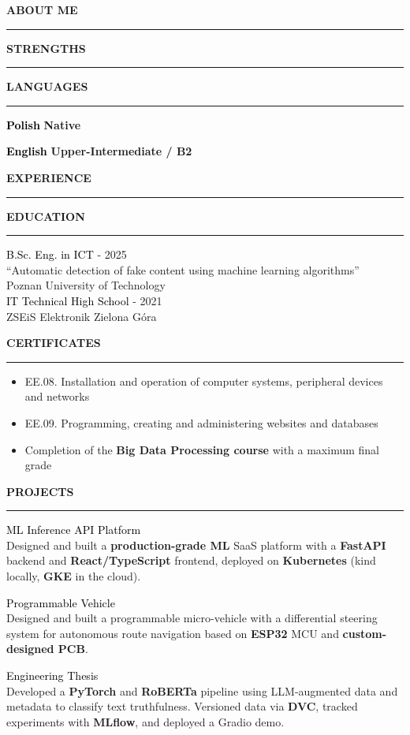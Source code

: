 \documentclass[a4paper,11pt]{article}
\newcommand{\CVSectionHeader}{%
    \headingfont\bfseries\fontsize{20pt}{22pt}\selectfont
    \color{secheadercolor}%
}
\newcommand{\CVSection}[2]{%
    \par
    {\CVSectionHeader \uppercase{#1}}\\
    \textcolor{hrcolor}{\rule{\textwidth}{0.1cm}}\vspace{0.2cm}
    #2
}
\newcommand{\ProjectsEntry}[3]{%
    {\fontsize{12pt}{10pt}\selectfont\textcolor{black}{#1} \href{#2}{\textcolor{accentcolor}{\faGithub}}}\\
    {\fontsize{8pt}{10pt}\selectfont#3}
}
\newcommand{\CVEduEntry}[3]{
    {\fontsize{12pt}{10pt}\selectfont \textcolor{black}{#1}}
    \hfill
    {\fontsize{9pt}{5pt}\selectfont #3} \\
    \textcolor{accentcolor}{#2} \\
}
\newcommand{\CVEduEntryExtra}[4]{
    {\fontsize{12pt}{10pt}\selectfont \textcolor{black}{#1}}
    \hfill
    {\fontsize{9pt}{5pt}\selectfont #3} \\
    {\fontsize{9pt}{5pt}\selectfont#4} \\
    \textcolor{accentcolor}{#2} \\
}
\newcommand{\CVCertificate}[1]{
    \item \fontsize{10pt}{5pt}\selectfont #1
}
\newcommand{\CVLanguage}[2]{
    {\fontsize{10pt}{5pt}\selectfont \textcolor{black}{\textbf{#1}} \hfill \textbf{#2}\\}
}
\newcommand{\dashedline}{
    \hdashrule{\textwidth}{0.5pt}{0.1cm}
}
\begin{document}
\begin{minipage}[t]{0.38\textwidth}
    \CVSection{About Me}{{\fontsize{10pt}{12pt}\selectfont
    }}
    \vspace{0.5cm}
    \CVSection{Strengths}{
    }
    \vspace{0.5cm}
    \CVSection{Languages}{
        \CVLanguage{Polish}{Native}
        \dashedline
        \CVLanguage{English}{Upper-Intermediate / B2}
    }
\end{minipage}
\hfill
\begin{minipage}[t]{0.58\textwidth}
    \CVSection{Experience}{
    }
    \vspace{0.5cm}
    \CVSection{Education}{
        \CVEduEntryExtra{B.Sc. Eng. in ICT}{Poznan University of Technology}{2021 - 2025}{``Automatic detection of fake content using machine learning algorithms''}
        
        \CVEduEntry{IT Technical High School}{ZSEiS Elektronik Zielona Góra}{2017 - 2021}
    }
    \CVSection{Certificates}{
        \begin{itemize}[leftmargin=*, topsep=0pt]\itemsep0em
            \CVCertificate{EE.08. Installation and operation of computer systems, peripheral devices and networks}
            \CVCertificate{EE.09. Programming, creating and administering websites and databases}
            \CVCertificate{Completion of the \textbf{Big Data Processing course} with a maximum final grade}
        \end{itemize}
    }
    \vspace{0.3cm}
    \CVSection{Projects}{
        \ProjectsEntry{ML Inference API Platform}{https://github.com/jegor377/mlops-project}{
            Designed and built a \textbf{production-grade ML} SaaS platform with a \textbf{FastAPI} backend and \textbf{React/TypeScript} frontend, deployed on \textbf{Kubernetes} (kind locally, \textbf{GKE} in the cloud).
        }

        \vspace{0.1cm}

        \ProjectsEntry{Programmable Vehicle}{https://github.com/jegor377/programmable-vehicle}{
            Designed and built a programmable micro-vehicle with a differential steering system for autonomous route navigation based on \textbf{ESP32} MCU and \textbf{custom-designed PCB}.
        }
        
        \vspace{0.1cm}

        \ProjectsEntry{Engineering Thesis}{https://github.com/jegor377/engineering_thesis}{
            Developed a \textbf{PyTorch} and \textbf{RoBERTa} pipeline using LLM-augmented data and metadata to classify text truthfulness. Versioned data via \textbf{DVC}, tracked experiments with \textbf{MLflow}, and deployed a Gradio demo.
        }
    }
\end{minipage}
\end{document}
